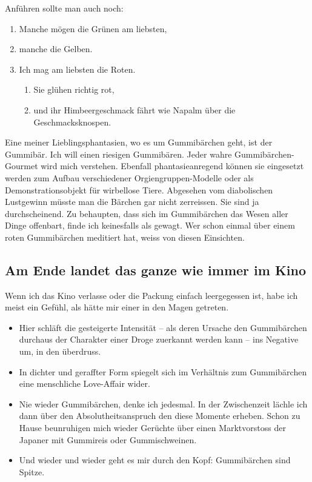 \documentclass{scrartcl}
\begin{document}
  Anführen sollte man auch noch: 
  \begin{enumerate}
    \item Manche mögen die Grünen am liebsten,
    \item manche die Gelben.
    \item Ich mag am liebsten die Roten.
    \begin{enumerate}
      \item Sie glühen richtig rot,
      \item und ihr Himbeergeschmack fährt wie Napalm über die Geschmacksknospen.
    \end{enumerate}
  \end{enumerate}
  Eine meiner Lieblingsphantasien, wo es um Gummibärchen geht, ist der Gummibär. Ich will einen riesigen Gummibären. Jeder wahre Gummibärchen-Gourmet wird mich verstehen. Ebenfall phantasieanregend können sie eingesetzt werden zum Aufbau verschiedener Orgiengruppen-Modelle oder als Demonstrationsobjekt für wirbellose Tiere. Abgesehen vom diabolischen Lustgewinn müsste man die Bärchen gar nicht zerreissen. Sie sind ja durchscheinend. Zu behaupten, dass sich im Gummibärchen das Wesen aller Dinge offenbart, finde ich keinesfalls als gewagt. Wer schon einmal über einem roten Gummibärchen meditiert hat, weiss von diesen Einsichten.

  \subsection[Im Kino]{Am Ende landet das ganze wie immer im Kino}

  Wenn ich das Kino verlasse oder die Packung einfach leergegessen ist, habe ich meist ein Gefühl, als hätte mir einer in den Magen getreten.
  \begin{itemize}
    \item Hier schläft die gesteigerte Intensität -- als deren Ursache den Gummibärchen durchaus der Charakter einer Droge zuerkannt werden kann -- ins Negative um, in den überdruss.
    \item In dichter und geraffter Form spiegelt sich im Verhältnis zum Gummibärchen eine menschliche Love-Affair wider.
    \item Nie wieder Gummibärchen, denke ich jedesmal. In der Zwischenzeit lächle ich dann über den Absolutheitsanspruch den diese Momente erheben. Schon zu Hause beunruhigen mich wieder Gerüchte über einen Marktvorstoss der Japaner mit Gummireis oder Gummischweinen.
    \item Und wieder und wieder geht es mir durch den Kopf: Gummibärchen sind Spitze.
  \end{itemize}
\end{document}
